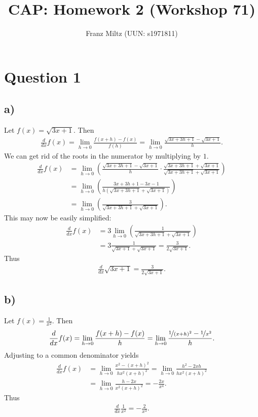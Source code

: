 \documentclass{article}
\title{CAP: Homework 2 (Workshop 71)}
\author{Franz Miltz (UUN: s1971811)}
\begin{document}
\maketitle
\section*{Question 1}
\subsection*{a)}
Let $f(x)=\sqrt{3x+1}$. Then
\begin{align*}
	\frac{d}{dx}f(x)=\lim_{h\to0}\frac{f(x+h)-f(x)}{f(h)}
	=\lim_{h\to0}\frac{\sqrt{3x+3h+1}-\sqrt{3x+1}}{h}.
\end{align*}
We can get rid of the roots in the numerator by multiplying by $1$.
\begin{align*}
	\frac{d}{dx}f(x) & =\lim_{h\to0}\left(\frac{\sqrt{3x+3h+1}-\sqrt{3x+1}}{h}\cdot\frac{\sqrt{3x+3h+1}+\sqrt{3x+1}}{\sqrt{3x+3h+1}+\sqrt{3x+1}}\right) \\
	                 & =\lim_{h\to0}\left(\frac{3x+3h+1-3x-1}{h(\sqrt{3x+3h+1}+\sqrt{3x+1})}\right)                                                     \\
	                 & =\lim_{h\to0}\left(\frac{3}{\sqrt{3x+3h+1}+\sqrt{3x+1}}\right).
\end{align*}
This may now be easily simplified:
\begin{align*}
	\frac{d}{dx}f(x) & = 3\lim_{h\to0}\left(\frac{1}{\sqrt{3x+3h+1}+\sqrt{3x+1}}\right) \\
	                 & =3\frac{1}{\sqrt{3x+1}+\sqrt{3x+1}}=\frac{3}{2\sqrt{3x+1}}.
\end{align*}
Thus
\begin{align*}
	\frac{d}{dx}\sqrt{3x+1}=\frac{3}{2\sqrt{3x+1}}.
\end{align*}
\subsection*{b)}
Let $f(x)=\frac{1}{x^2}$. Then
\begin{align*}
	\frac{d}{dx}f(x)=\lim_{h\to0}\frac{f(x+h)-f(x)}{h}=\lim_{h\to0}\frac{\nicefrac{1}{(x+h)^2}-\nicefrac{1}{x^2}}{h}.
\end{align*}
Adjusting to a common denominator yields
\begin{align*}
	\frac{d}{dx}f(x) & =\lim_{h\to0}\frac{x^2-(x+h)^2}{hx^2(x+h)^2}
	=\lim_{h\to0}\frac{h^2-2xh}{hx^2(x+h)^2}                                 \\
	                 & =\lim_{h\to0}\frac{h-2x}{x^2(x+h)^2}=-\frac{2x}{x^4}.
\end{align*}
Thus
\begin{align*}
	\frac{d}{dx}\frac{1}{x^2}=-\frac{2}{x^3}.
\end{align*}
\end{document}
